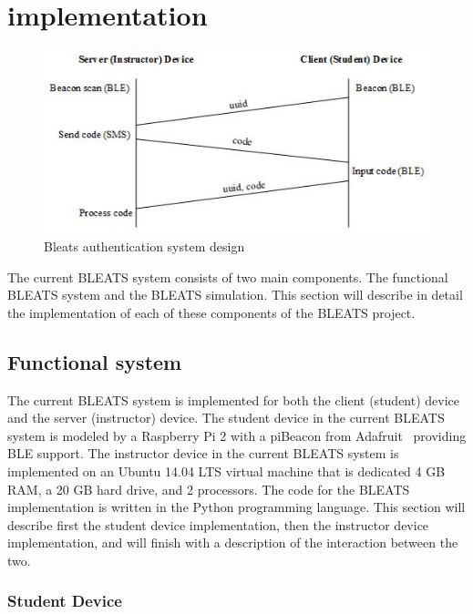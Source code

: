\section{implementation}

\label{sec:implementation}

\begin{figure} \centering
\includegraphics[width=\columnwidth]{figures/bleats-design.png}
\caption{Bleats authentication system design}
\label{fig:bleats-design} \end{figure}

The current BLEATS system consists of two main components. The functional
BLEATS system and the BLEATS simulation. This section will describe in detail
the implementation of each of these components of the BLEATS project.

\subsection{Functional system}

The current BLEATS system is implemented for both the client (student) device
and the server (instructor) device. The student device in the current BLEATS
system is modeled by a Raspberry Pi 2 with a piBeacon from Adafruit~\cite{adafruit}
providing BLE support. The instructor device in the current BLEATS system is
implemented on an Ubuntu 14.04 LTS virtual machine that is dedicated 4 GB RAM,
a 20 GB hard drive, and 2 processors. The code for the BLEATS implementation is
written in the Python programming language. This section will describe first
the student device implementation, then the instructor device implementation,
and will finish with a description of the interaction between the two.

\subsubsection{Student Device}

